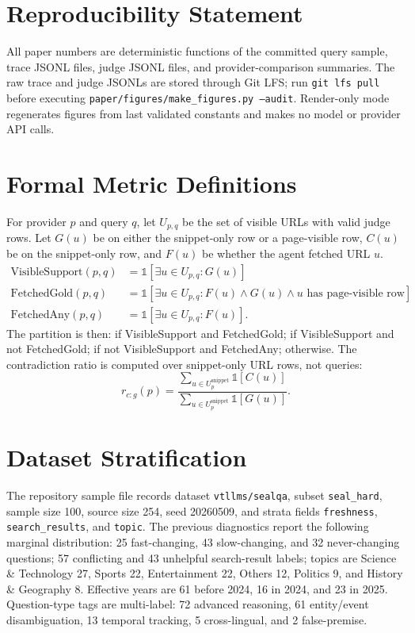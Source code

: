 \section*{Reproducibility Statement}
All paper numbers are deterministic functions of the committed query sample, trace JSONL files, judge JSONL files, and provider-comparison summaries. The raw trace and judge JSONLs are stored through Git LFS; run \texttt{git lfs pull} before executing \texttt{paper/figures/make\_figures.py --audit}. Render-only mode regenerates figures from last validated constants and makes no model or provider API calls.



\appendix

\section{Formal Metric Definitions}
\label{app:metrics}
For provider $p$ and query $q$, let $U_{p,q}$ be the set of visible URLs with valid judge rows. Let $G(u)$ be \containsGold{} on either the snippet-only row or a page-visible row, $C(u)$ be \contraGold{} on the snippet-only row, and $F(u)$ be whether the agent fetched URL $u$.
\begin{align*}
\mathrm{VisibleSupport}(p,q) &= \mathbb{1}[\exists u\in U_{p,q}: G(u)] \\
\mathrm{FetchedGold}(p,q) &= \mathbb{1}[\exists u\in U_{p,q}: F(u) \land G(u) \land u\text{ has page-visible row}] \\
\mathrm{FetchedAny}(p,q) &= \mathbb{1}[\exists u\in U_{p,q}: F(u)].
\end{align*}
The partition is then: \smart{} if VisibleSupport and FetchedGold; \missed{} if VisibleSupport and not FetchedGold; \blind{} if not VisibleSupport and FetchedAny; \noop{} otherwise. The contradiction ratio is computed over snippet-only URL rows, not queries:
\[
 r_{c:g}(p)=\frac{\sum_{u\in U_p^{\mathrm{snippet}}}\mathbb{1}[C(u)]}{\sum_{u\in U_p^{\mathrm{snippet}}}\mathbb{1}[G(u)]}.
\]

\section{Dataset Stratification}
\label{app:dataset}
The repository sample file records dataset \texttt{vtllms/sealqa}, subset \texttt{seal\_hard}, sample size 100, source size 254, seed 20260509, and strata fields \texttt{freshness}, \texttt{search\_results}, and \texttt{topic}. The previous diagnostics report the following marginal distribution: 25 fast-changing, 43 slow-changing, and 32 never-changing questions; 57 conflicting and 43 unhelpful search-result labels; topics are Science \& Technology 27, Sports 22, Entertainment 22, Others 12, Politics 9, and History \& Geography 8. Effective years are 61 before 2024, 16 in 2024, and 23 in 2025. Question-type tags are multi-label: 72 advanced reasoning, 61 entity/event disambiguation, 13 temporal tracking, 5 cross-lingual, and 2 false-premise.

